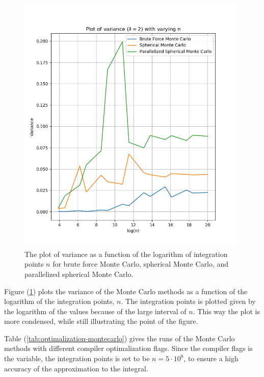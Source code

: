 \documentclass{article}
\begin{document}
  \newpage
  \clearpage

  \begin{figure}[ht]
    \centering
    \includegraphics[width = 11cm]{images/variance-montecarlo.png}
    \caption{The plot of variance as a function of the logarithm of integration points $n$ for brute force Monte Carlo, spherical Monte Carlo, and parallelized spherical Monte Carlo. }
    \label{fig:variancemontecarlopng}
  \end{figure}

  Figure (\ref{fig:variancemontecarlopng}) plots the variance of the Monte Carlo methods as a function of the logarithm of the integration points, $n$. The integration points is plotted given by the logarithm of the values because of the large interval of $n$. This way the plot is more condensed, while still illustrating the point of the figure. \\

  \newpage

  Table (\ref{tab:optimalization-montecarlo}) gives the runs of the Monte Carlo methods with different compiler optimalization flags. Since the compiler flags is the variable, the integration points is set to be $n = 5 \cdot 10^8$, to ensure a high accuracy of the approximation to the integral.
\end{document}
